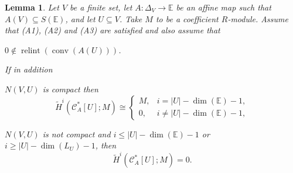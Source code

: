 \documentclass[a4paper,11pt,reqno, english]{amsart}
\newtheorem{lemma}[theorem]{Lemma}
\theoremstyle{definition}
\theoremstyle{remark}
\newcommand\CC{\mathscr C}
\newcommand\E{\mathbb{E}}
\DeclareMathOperator{\relint}{\mathrm{relint}}
\DeclareMathOperator{\conv}{\mathrm{conv}}
\begin{document}
\medskip
\begin{lemma}
	\label{lem : topology of induced sub-complexes 08 }
	Let $V$ be a finite set, let $A\colon \Delta_V\longrightarrow\E$ be an affine map such that $A(V)\subseteq S(\E)$, and let $U\subseteq V$.
	Take $M$ to be a coefficient $R$-module.
	Assume that {\rm (A1)}, {\rm (A2)} and {\rm (A3)} are satisfied and also assume that
	\begin{compactenum}
		\item[\rm (A4)] 	$0\notin\relint(\conv (A(U)))$.
	\end{compactenum}
	If in addition
	\begin{compactenum}[\rm \quad (1)]
		\item  $N(V,U)$ is compact then
		\begin{equation}
			\label{eq : dual of dual 08 - 1}
			\widetilde{H}^i(\CC_A^*[U];M)\cong
			\begin{cases}
				M, & i=|U|-\dim(\E)-1,     \\
				0, & i\neq |U|-\dim(\E)-1,
			\end{cases}
		\end{equation}
		\item $N(V,U)$ is not compact and $i\leq |U|-\dim(\E)-1$ or $i\geq |U|-\dim(L_U)-1$, then
		\begin{equation}
			\label{eq : dual of dual 08 - 2}
			\widetilde{H}^i(\CC_A^*[U];M)= 0.
		\end{equation}
	\end{compactenum}
\end{lemma}
\end{document}
